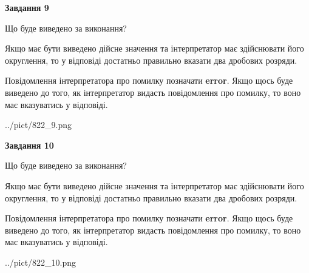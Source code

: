 \documentclass[12pt, ukrainian]{article}
\begin{document}
{\begin {Large}
{\begin {center}\textbf{Завдання 9}\end {center}}\par
Що буде виведено за виконання? \par

Якщо має бути виведено дійсне значення та інтерпретатор має здійснювати його округлення, 
то у відповіді достатньо правильно вказати два дробових розряди.

Повідомлення інтерпретатора про помилку позначати \textbf{error}.
Якщо щось буде виведено до того, як інтерпретатор видасть повідомлення про помилку, 
то воно має вказуватись у відповіді. \par

\begin{center}
	{../pict/822_9.png}
\end{center}
\newpage

{\begin {center}\textbf{Завдання 10}\end {center}}\par
Що буде виведено за виконання? \par

Якщо має бути виведено дійсне значення та інтерпретатор має здійснювати його округлення, 
то у відповіді достатньо правильно вказати два дробових розряди.

Повідомлення інтерпретатора про помилку позначати \textbf{error}.
Якщо щось буде виведено до того, як інтерпретатор видасть повідомлення про помилку, 
то воно має вказуватись у відповіді. \par

\begin{center}
	{../pict/822_10.png}
\end{center}
\newpage

\end {Large}}
\end{document}
